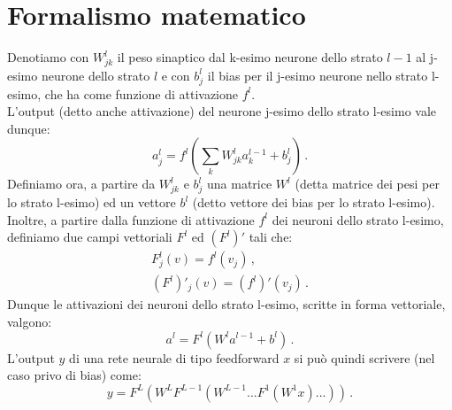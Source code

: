\documentclass[Lau, noexaminfo, oneside]{sapthesis} %
\begin{document}
\section{Formalismo matematico}
Denotiamo con $W_{jk}^l$ il peso sinaptico dal k-esimo neurone dello strato $l-1$ al j-esimo neurone dello strato $l$ e con $b^l_j$ il bias per il j-esimo neurone nello strato l-esimo, che ha come funzione di attivazione $f^l$.\\
L'output (detto anche attivazione) del neurone j-esimo dello strato l-esimo vale dunque:
\begin{equation}
a_j^l = f^l(\sum_k W_{jk}^l a_k^{l-1} + b_j^l) \,.
\label{attivazioni}
\end{equation}
Definiamo ora, a partire da $W_{jk}^l$ e $b^l_j$ una matrice $W^l$ (detta matrice dei pesi per lo strato l-esimo) ed un vettore $b^l$ (detto vettore dei bias per lo strato l-esimo).
Inoltre, a partire dalla funzione di attivazione $f^l$ dei neuroni dello strato l-esimo, definiamo due campi vettoriali $F^l$ ed $(F^l)'$ tali che:
\begin{align}
F^l_j(v) = f^l(v_j) \,,\\
(F^l)'_j(v) = (f^l)'(v_j) \,.
\end{align}
Dunque le attivazioni dei neuroni dello strato l-esimo, scritte in forma vettoriale, valgono:
\begin{equation}
a^l = F^l(W^l a^{l-1} + b^l) \,.
\end{equation}
L'output $y$ di una rete neurale di tipo feedforward $x$ si può quindi scrivere (nel caso privo di bias) come:
\begin{equation}
y = F^L (W^L F^{L-1}(W^{L-1} ... F^1 ( W^1 x ) ... )) \,.
\end{equation}
\end{document}
